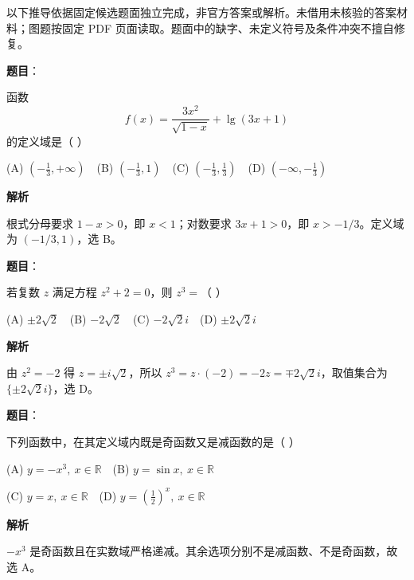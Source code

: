 

\begin{gktip}
以下推导依据固定候选题面独立完成，非官方答案或解析。未借用未核验的答案材料；图题按固定 PDF 页面读取。题面中的缺字、未定义符号及条件冲突不擅自修复。
\end{gktip}

\begin{answer}

\textbf{题目}：

函数
\nopagebreak[4]
\[
f(x)=\frac{3x^2}{\sqrt{1-x}}+\lg(3x+1)
\]
的定义域是（  ）

(A) \(\left(-\frac13,+\infty\right)\)　(B) \(\left(-\frac13,1\right)\)　(C) \(\left(-\frac13,\frac13\right)\)　(D) \(\left(-\infty,-\frac13\right)\)

\textbf{解析}

根式分母要求 $1-x>0$，即 $x<1$；对数要求 $3x+1>0$，即 $x>-1/3$。定义域为 $(-1/3,1)$，选 B。


\end{answer}
\begin{answer}

\textbf{题目}：

若复数 \(z\) 满足方程 \(z^2+2=0\)，则 \(z^3=\)（  ）

(A) \(\pm2\sqrt2\)　(B) \(-2\sqrt2\)　(C) \(-2\sqrt2 i\)　(D) \(\pm2\sqrt2 i\)

\textbf{解析}

由 $z^2=-2$ 得 $z=\pm i\sqrt2$，所以 $z^3=z\cdot(-2)=-2z=\mp2\sqrt2 i$，取值集合为 $\{\pm2\sqrt2 i\}$，选 D。


\end{answer}
\begin{answer}

\textbf{题目}：

下列函数中，在其定义域内既是奇函数又是减函数的是（  ）

(A) \(y=-x^3,\ x\in\mathbb R\)　(B) \(y=\sin x,\ x\in\mathbb R\)

(C) \(y=x,\ x\in\mathbb R\)　(D) \(y=\left(\frac12\right)^x,\ x\in\mathbb R\)

\textbf{解析}

$-x^3$ 是奇函数且在实数域严格递减。其余选项分别不是减函数、不是奇函数，故选 A。


\end{answer}

